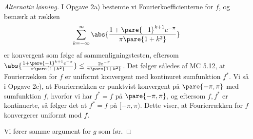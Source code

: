 \documentclass{article}
\begin{document}
\begin{opg}
\begin{enumerate}
\begin{proof}[Alternativ løsning]
I Opgave 2a) bestemte vi Fourierkoefficienterne for $f$, og bemærk at rækken
$$ \sum_{k=-\infty}^\infty \abs{\frac{1 + \pare{-1}^{k+1}e^{-\pi}}{\pi\pare{1+k^2}}} $$
er konvergent som følge af sammenligningstesten, eftersom $\abs{\frac{1+\pare{-1}^{k+1}e^{-\pi}}{\pi\pare{1+k^2}}}\leq\frac{2e^{-\pi}}{\pi\pare{1+k^2}}$. Det følger således af MC 5.12, at Fourierrækken for $f$ er uniformt konvergent med kontinuret sumfunktion $f^*$. Vi så i Opgave 2c), at Fourierrækken er punktvist konvergent på $\pare{-\pi,\pi}$ med sumfunktion $f$, hvorfor vi har $f^* = f$ på $\pare{-\pi,\pi}$, og eftersom $f,f
^*$ er kontinuerte, så følger det at $f^* = f$ på $[-\pi,\pi)$. Dette viser, at Fourierrækken for $f$ konvergerer uniformt mod $f$. 

Vi fører samme argument for $g$ som før.
\end{proof}
\end{enumerate}
\end{opg}
\end{document}
